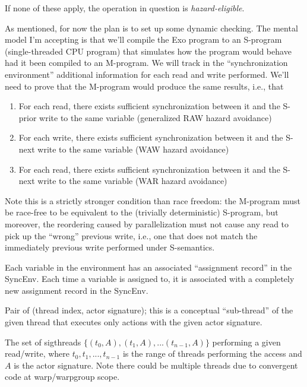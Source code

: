 If none of these apply, the operation in question is \textit{hazard-eligible}.

\filbreak
{}

As mentioned, for now the plan is to set up some dynamic checking.
The mental model I'm accepting is that we'll compile the Exo program to an S-program (single-threaded CPU program) that simulates how the program would behave had it been compiled to an M-program.
We will track in the ``synchronization environment'' additional information for each read and write performed.
We'll need to prove that the M-program would produce the same results, i.e., that
\begin{enumerate}
  \item For each read, there exists sufficient synchronization between it and the S-prior write to the same variable (generalized RAW hazard avoidance)
  \item For each write, there exists sufficient synchronization between it and the S-next write to the same variable (WAW hazard avoidance)
  \item For each read, there exists sufficient synchronization between it and the S-next write to the same variable (WAR hazard avoidance)
\end{enumerate}

\filbreak
Note this is a strictly stronger condition than race freedom: the M-program must be race-free to be equivalent to the (trivially deterministic) S-program, but moreover, the reordering caused by parallelization must not cause any read to pick up the ``wrong'' previous write, i.e., one that does not match the immediately previous write performed under S-semantics.

\filbreak
{} Each variable in the environment has an associated ``assignment record'' in the SyncEnv.
Each time a variable is assigned to, it is associated with a completely new assignment record in the SyncEnv.

\filbreak
{} Pair of (thread index, actor signature); this is a conceptual ``sub-thread'' of the given thread that executes only actions with the given actor signature.

\filbreak
{}
The set of sigthreads $\{(t_0, A), (t_1, A), ... (t_{n-1}, A)\}$ performing a given read/write, where $t_0, t_1, ... ,t_{n-1}$ is the range of threads performing the access and $A$ is the actor signature.
Note there could be multiple threads due to convergent code at warp/warpgroup scope.

